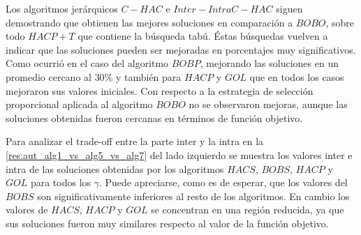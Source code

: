 Los algoritmos jerárquicos $C-HAC$ e $Inter-Intra C-HAC$ siguen demostrando que obtienen las mejores soluciones en comparación a $BOBO$, sobre todo $HACP+T$ que contiene la búsqueda tabú. Éstas búsquedas vuelven a indicar que las soluciones pueden ser mejoradas en porcentajes muy significativos. Como ocurrió en el caso del algoritmo $BOBP$, mejorando las soluciones en un promedio cercano al $30\%$ y también para $HACP$ y $GOL$ que en todos los casos mejoraron sus valores iniciales. Con respecto a la estrategia de selección proporcional aplicada al algoritmo $BOBO$ no se observaron mejoras, aunque las soluciones obtenidas fueron cercanas en términos de función objetivo. 

\begin{table}[H]
\begin{center}
\caption{Comparación de calidad de soluciones entre algoritmos para la \hyperref[busqueda:autores]{búsqueda de autores}} 
\end{center}
\end{table}

Para analizar el trade-off entre la parte inter y la intra en la \autoref{res:aut_alg1_vs_alg5_vs_alg7} del lado izquierdo se muestra los valores inter e intra de las soluciones obtenidas por los algoritmos $HACS$, $BOBS$, $HACP$ y $GOL$ para todos los $\gamma$. Puede apreciarse, como es de esperar, que los valores del $BOBS$ son significativamente inferiores al resto de los algoritmos. En cambio los valores de $HACS$, $HACP$ y $GOL$ se concentran en una región reducida, ya que sus soluciones fueron muy similares respecto al valor de la función objetivo.

